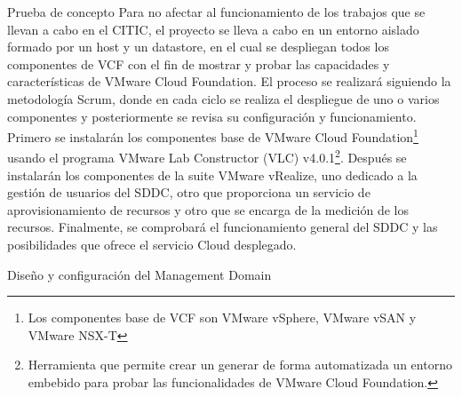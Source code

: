 \begin{section}{Prueba de concepto}
    \label{subsect:prueba-concepto}
Para no afectar al funcionamiento de los trabajos que se llevan a cabo en el CITIC, el proyecto se lleva a cabo en un entorno aislado formado por un host y un datastore, en el cual se despliegan todos los componentes de VCF con el fin de mostrar y probar las capacidades y características de VMware Cloud Foundation. 
El proceso se realizará siguiendo la metodología Scrum, donde en cada ciclo se realiza el despliegue de uno o varios componentes y posteriormente se revisa su configuración y funcionamiento. Primero se instalarán los componentes base de VMware Cloud Foundation\footnote{Los componentes base de VCF son VMware vSphere, VMware vSAN y VMware NSX-T} usando el programa VMware Lab Constructor (VLC) v4.0.1\footnote{Herramienta que permite crear un generar de forma automatizada un entorno embebido para probar las funcionalidades de VMware Cloud Foundation.}. Después se instalarán los componentes de la suite VMware vRealize, uno dedicado a la gestión de usuarios del SDDC, otro que proporciona un servicio de aprovisionamiento de recursos y otro que se encarga de la medición de los recursos. Finalmente, se comprobará el funcionamiento general del SDDC y las posibilidades que ofrece el servicio Cloud desplegado.



\begin{subsection}{Diseño y configuración del Management Domain}


\end{subsection}


\end{section}